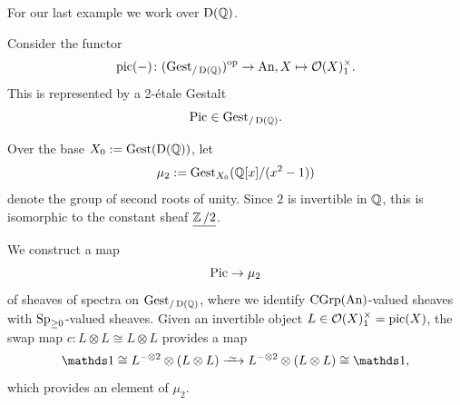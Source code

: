 \documentclass[11pt]{book}
\begin{document}
	For our last example we work over $\operatorname{\mathrm{D}}(\operatorname{\mathbb Q})$.

	\begin{example}
		Consider the functor
		\[
			\operatorname{pic}(-)\colon ({\textup{Gest}}_{/\operatorname{\mathrm{D}}(\operatorname{\mathbb Q})})^{\textup{op}} \to {\textup{An}}, X \mapsto \mathcal{O}(X)_1^{\times}.
		\]
		This is represented by a 2-étale Gestalt
		\[
			\operatorname{Pic} \in {\textup{Gest}}_{/\operatorname{\mathrm{D}}(\operatorname{\mathbb Q})}.
		\]
	\end{example}

	\begin{construction}
		Over the base $X_0 := {\textup{Gest}}(\operatorname{\mathrm{D}}(\operatorname{\mathbb Q}))$, let
		\[
			\mu_2 := {\textup{Gest}}_{X_0}(\operatorname{\mathbb Q}[x]/(x^2-1))
		\]
		denote the group of second roots of unity. Since $2$ is invertible in $\operatorname{\mathbb Q}$, this is isomorphic to the constant sheaf $\underline{\operatorname{\mathbb Z}/2}$.

		We construct a map
		\[
			\operatorname{Pic} \to \mu_2
		\]
		of sheaves of spectra on ${\textup{Gest}}_{/\operatorname{\mathrm{D}}(\operatorname{\mathbb Q})}$, where we identify ${\textup{CGrp}}({\textup{An}})$-valued sheaves with ${\textup{Sp}}_{\geq 0}$-valued sheaves. Given an invertible object $L \in \mathcal{O}(X)^{\times}_1 = \operatorname{pic}(X)$, the swap map $c\colon L \otimes L \cong L \otimes L$ provides a map
		\[
			\unit \cong L^{-\otimes 2} \otimes (L \otimes L) \iso L^{-\otimes 2} \otimes (L \otimes L) \cong \unit,
		\]
		which provides an element of $\mu_2$.
	\end{construction}
\end{document}
